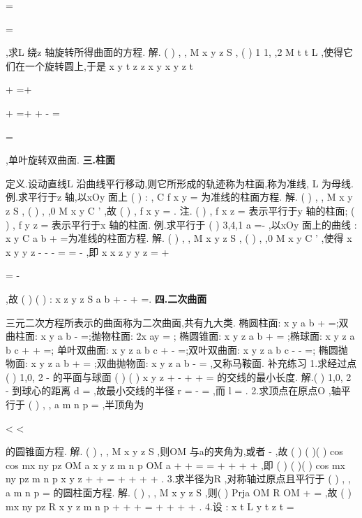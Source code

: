 =

=

,求L 绕z 轴旋转所得曲面的方程. 
解.
(
)
, ,
M x y z
S
\forall 
\in 
,
(
)
1 1, ,2
M
t
t
L
\exists 
\in 
,使得它们在一个旋转圆上,于是 
x
y
t
z
z
x
y
x
y
z
t

+
=+


\Rightarrow 
+
=+
\Rightarrow 
+
-
=



=



,单叶旋转双曲面. 
\vspace{4pt}
{\bfseries \textcolor{lyred}{三.柱面}}

\textcolor{lyred}{定义}.设动直线L 沿曲线\Gamma 平行移动,则它所形成的轨迹称为\textcolor{lyred}{柱面},称\Gamma 为\textcolor{lyred}{准线}, 
L 为\textcolor{lyred}{母线}. 
\textcolor{lyred}{例}.求平行于z 轴,以xOy 面上
(
)
:
,
C
f x y =
为准线的柱面方程. 
解.
(
)
, ,
M x y z
S
\forall 
\in 
,
(
)
, ,0
M
x y
C
'
\in 
,故
(
)
,
f x y =
. 
\textcolor{lyred}{注}.
(
)
,
f x z =
表示平行于y 轴的柱面;
(
)
,
f
y z =
表示平行于x 轴的柱面. 
\textcolor{lyred}{例}.求平行于
(
)
3,4,1
a =-
\rho 
,以xOy 面上的曲线
:
x
y
C a
b
+
=为准线的柱面方程. 
解.
(
)
, ,
M x y z
S
\forall 
\in 
,
(
)
,
,0
M
x y
C
'
\exists 
\in 
,使得
x
x
y
y
z
-
-
-
=
=
-
,即 
x
x
z
y
y
z
=
+


=
-

,故
(
)
(
)
:
x
z
y
z
S
a
b
+
-
+
=. 
\vspace{4pt}
{\bfseries \textcolor{lyred}{四.二次曲面}}

三元二次方程所表示的曲面称为\textcolor{lyred}{二次曲面},共有九大类. 
\textcolor{lyred}{椭圆柱面}:
x
y
a
b
+
=;\textcolor{lyred}{双曲柱面}:
x
y
a
b
-
=;\textcolor{lyred}{抛物柱面}:
2x
ay
=
; 
\textcolor{lyred}{椭圆锥面}:
x
y
z
a
b
+
=
;\textcolor{lyred}{椭球面}:
x
y
z
a
b
c
+
+
=; 
\textcolor{lyred}{单叶双曲面}:
x
y
z
a
b
c
+
-
=;\textcolor{lyred}{双叶双曲面}:
x
y
z
a
b
c
-
-
=; 
\textcolor{lyred}{椭圆抛物面}:
x
y
z
a
b
+
=
;\textcolor{lyred}{双曲抛物面}:
x
y
z
a
b
-
=
,又称\textcolor{lyred}{马鞍面}. 
\textcolor{lyred}{补充练习 }
1.求经过点(
)
1,0, 2
-
的平面与球面
(
)
(
)
x
y
z
+
-
+
+
=
的交线的最小长度. 
解.(
)
1,0, 2
-
到球心的距离
d =
,故最小交线的半径
r =
-
=
,而
l
\pi 
=
. 
2.求顶点在原点O ,轴平行于
(
)
, ,
a
m n p
=
\rho 
,半顶角为
\pi 
\theta 
\theta 


<
<




的圆锥面方程. 
解.
(
)
, ,
M x y z
S
\forall 
\in 
,则OM
\xi \xi \xi \xi \rho 
与a\rho 的夹角为\theta ,或者\pi 
\theta 
-
,故 
(
)
(
)(
)
cos
cos
mx
ny
pz
OM a
x
y
z
m
n
p
OM a
\theta 
\theta 
+
+
\cdots 
=\pm 
\Rightarrow 
=
+
+
+
+
\xi \xi \xi \xi \rho \rho 
\xi \xi \xi \xi \rho \rho 
,即 
(
)
(
)(
)
cos
mx
ny
pz
m
n
p
x
y
z
\theta 
+
+
=
+
+
+
+
. 
3.求半径为R ,对称轴过原点且平行于
(
)
, ,
a
m n p
=
\rho 
的圆柱面方程. 
解.
(
)
, ,
M x y z
S
\forall 
\in 
,则(
)
Prja OM
R
OM
+
=
\rho \xi \xi \xi \xi \rho 
\xi \xi \xi \xi \rho 
,故 
(
)
mx
ny
pz
R
x
y
z
m
n
p
+
+
+
=
+
+
+
+
. 
4.设
:
x
t
L
y
t
z
t
=


